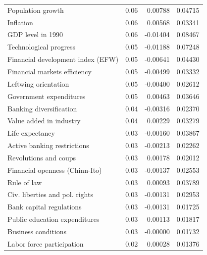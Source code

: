\begin{refsection}
\begin{subappendices}
\begin{table}[!ht]
\begin{tabular}{lrrr}
      Population growth & 0.06 & 0.00788 & 0.04715 \\ 
      Inflation & 0.06 & 0.00568 & 0.03341 \\ 
      GDP level in 1990 & 0.06 & -0.01404 & 0.08467 \\ 
      Technological progress & 0.05 & -0.01188 & 0.07248 \\ 
      Financial development index (EFW) & 0.05 & -0.00641 & 0.04430 \\ 
      Financial markets efficiency & 0.05 & -0.00499 & 0.03332 \\ 
      Leftwing orientation & 0.05 & -0.00400 & 0.02612 \\ 
      Government expenditures & 0.05 & 0.00463 & 0.03646 \\ 
      Banking diversification & 0.04 & -0.00316 & 0.02370 \\ 
      Value added in industry & 0.04 & 0.00229 & 0.03279 \\ 
      Life expectancy & 0.03 & -0.00160 & 0.03867 \\ 
      Active banking restrictions & 0.03 & -0.00213 & 0.02262 \\ 
      Revolutions and coups & 0.03 & 0.00178 & 0.02012 \\ 
      Financial openness (Chinn-Ito) & 0.03 & -0.00137 & 0.02553 \\ 
      Rule of law & 0.03 & 0.00093 & 0.03789 \\ 
      Civ. liberties and pol. rights & 0.03 & -0.00131 & 0.02953 \\ 
      Bank capital regulations & 0.03 & -0.00131 & 0.01725 \\ 
      Public education expenditures & 0.03 & 0.00113 & 0.01817 \\ 
      Business conditions & 0.03 & -0.00000 & 0.01732 \\ 
      Labor force participation & 0.02 & 0.00028 & 0.01376 \\  
      \midrule
      \bottomrule
    \end{tabular}
    \end{table}
    
    \clearpage
    

\end{subappendices}
\end{refsection}
